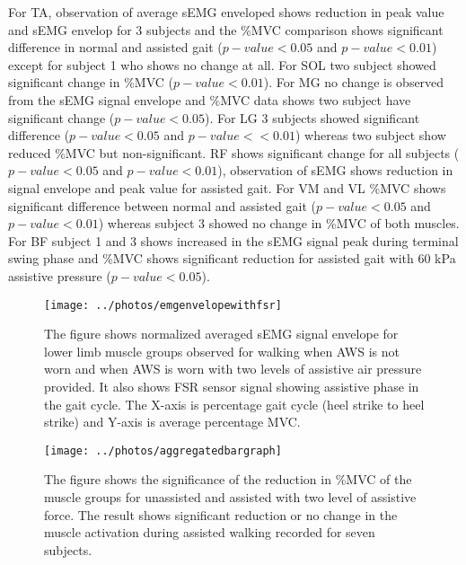 \documentclass[letterpaper, 10 pt, conference]{ieeeconf}  %
\begin{document}
For TA, observation of average sEMG enveloped shows reduction in peak value and sEMG envelop for 3 subjects and the \%MVC comparison shows significant difference in normal and assisted gait ($p-value < 0.05$ and $p-value < 0.01$) except for subject 1 who shows no change at all. For SOL two subject showed significant change in \%MVC ($p-value < 0.01$). For MG no change is observed from the sEMG signal envelope and \%MVC data shows two subject have significant change ($p-value < 0.05$). For LG 3 subjects showed significant difference ($p-value < 0.05$ and $p-value < <0.01$) whereas two subject show reduced \%MVC but non-significant. RF shows significant change for all subjects ($p-value < 0.05$ and $p-value < 0.01$), observation of sEMG shows reduction in signal envelope and peak value for assisted gait. For VM and VL \%MVC shows significant difference between normal and assisted gait ($p-value < 0.05$ and $p-value < 0.01$) whereas subject 3 showed no change in \%MVC of both muscles. For BF subject 1 and 3 shows increased in the sEMG signal peak during terminal swing phase and \%MVC shows significant reduction for assisted gait with 60 kPa assistive pressure ($p-value < 0.05$).

\begin{figure*}
	\centering
	\texttt{[image: ../photos/emgenvelopewithfsr]}
	\caption{The figure shows normalized averaged sEMG signal envelope for lower limb muscle groups observed for walking when AWS is not worn and when AWS is worn with two levels of assistive air pressure provided. It also shows FSR sensor signal showing assistive phase in the gait cycle. The X-axis is percentage gait cycle (heel strike to heel strike) and Y-axis is average percentage MVC.}
	\label{fig:emgenvelope}
\end{figure*}

\begin{figure*}
	\centering
	\texttt{[image: ../photos/aggregatedbargraph]}
	\caption{The figure shows the significance of the reduction in \%MVC of the muscle groups for unassisted and assisted with two level of assistive force. The result shows significant reduction or no change in the muscle activation during assisted walking recorded for seven subjects.}
	\label{fig:aggregatedbargraph}
\end{figure*}
\end{document}
